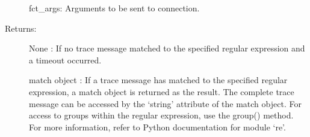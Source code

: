 \documentclass[letterpaper,10pt,english]{sphinxmanual}
\begin{document}
\begin{fulllineitems}
\begin{fulllineitems}
\begin{description}
\sphinxAtStartPar
fct\_args: Arguments to be sent to connection.

\item[{Returns:}] \leavevmode
\sphinxAtStartPar
None :    If no trace message matched to the specified regular expression and a timeout occurred.

\sphinxAtStartPar
match object : If a trace message has matched to the specified regular expression, a match object is returned as the result.                         The complete trace message can be accessed by the ‘string’ attribute of the match object.                         For access to groups within the regular expression, use the group() method.                         For more information, refer to Python documentation for module ‘re’.

\end{description}

\end{fulllineitems}


\end{fulllineitems}

\label{\detokenize{QConnectBase:module-QConnectBase.qlogger}}
\end{document}
